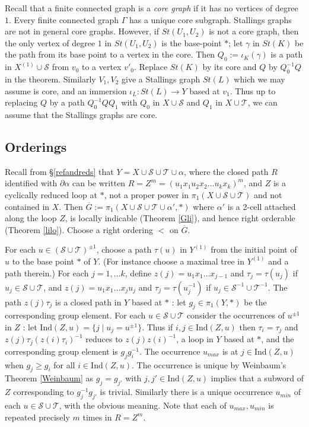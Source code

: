 \documentclass[12pt,a4paper]{amsart}
\def\ol{\overline}
\def\G{\Gamma}
\def\g{\gamma}
\def\cS{\mathcal{S}}
\def\cT{\mathcal{T}}
\begin{document}
Recall that a finite 
connected graph is a {\em core graph} if it has no vertices of degree $1$. 
Every finite connected graph $\G$ has a unique core subgraph. 
Stallings graphs are not in general core graphs.  
However, if $St(U_1,U_2)$ is not a core graph, then the only vertex of degree $1$ in $St(U_1,U_2)$ 
is the base-point $*$;  
let $\g$ in $St(K)$ be the path from its base point to a vertex in the core. 
   Then $Q_0:=\iota_K(\g)$ is  a path in $X^{(1)}\cup\cS$ from $v_0$ to a vertex $v'_0$.  Replace $St(K)$ by its core and $Q$ by $Q_0^{-1}Q$ in the theorem.  
   Similarly $V_1,V_2$ give a Stallings graph $St(L)$ which we may assume is core, 
   and an immersion $\iota_L:St(L)\to Y$ based at $v_1$.
   Thus up to replacing $Q$ by a path  $Q_0^{-1}QQ_1$ with $Q_0$ in $X\cup \cS$ and $Q_1$ in $X\cup\cT$,
   we can assume that the Stallings graphs are core.




\subsection{Orderings}\label{ords}

Recall from  \S \ref{refandreds} that $Y=X\cup\cS\cup\cT\cup\alpha$, where
the closed path  $R$  identified with $\partial\alpha$ can be written  $R=Z^m=(u_1x_1u_2x_2\dots u_{k}x_k)^m$,
and $Z$ is a cyclically reduced loop at $*$,   not a proper power in   $\pi_1(X\cup\cS\cup\cT)$  and not contained in $X$.
Then $\ol{G}:=\pi_1(X\cup\cS\cup\cT\cup\alpha',*)$ where $\alpha'$ is a 2-cell attached along the loop $Z$,
is locally indicable (Theorem \ref{Gli}), and hence right orderable (Theorem \ref{lilo}).   
 Choose a right ordering $<$ on $\ol{G}$.

\smallskip
For each  $u\in(\cS\cup\cT)^{\pm1}$, choose a path $\tau(u)$ in $Y^{(1)}$ 
from the initial point of $u$ to the base point $*$ of $Y$.
(For instance choose a maximal tree in $Y^{(1)}$ and a path therein.)
For each $j=1,\dots k$, define $z(j) = u_1x_1\dots x_{j-1}$ and $\tau_j=\tau(u_j)$ if
$u_j\in\cS\cup\cT$, and $z(j) = u_1x_1\dots x_ju_j$ and   $\tau_j=\tau(u_j^{-1})$ if $u_j\in\cS^{-1}\cup\cT^{-1}$.
The path $z(j)\tau_j$ is  a closed path in $Y$ based at $*$ : let $g_j\in\pi_1(Y,*)$
be the corresponding group element.
For each $u\in \cS\cup\cT$ consider the occurrences of $u^{\pm1}$ in $Z$ :  
let $\text{Ind}(Z,u)=\{j \mid  u_j =u^{\pm1}\}$.
Thus if $i,j\in \text{Ind}(Z,u)$  
then $\tau_i=\tau_j$ and $ z(j)\tau_j(z(i)\tau_i)^{-1}$ reduces to $z(j)z(i)^{-1}$,
a loop in $Y$ based at  $*$, and the corresponding group element is $g_jg_i^{-1}$.
The occurrence $u_{max}$ is at $j\in \text{Ind}(Z,u)$ when $g_j\ge g_i$ for all $i\in \text{Ind}(Z,u)$.
The occurrence is unique by Weinbaum's Theorem \ref{Weinbaum} as $g_j=g_{j'}$ with $j,j'\in \text{Ind}(Z,u)$
implies that a subword of $Z$ corresponding to  $g_j^{-1}g_{j'}$ is trivial.
Similarly there is a unique occurrence $u_{min}$ of each $u\in\cS\cup\cT$, with the obvious meaning.   
Note that each of $u_{max},u_{min}$ is repeated precisely $m$ times in $R=Z^m$.
\end{document}
